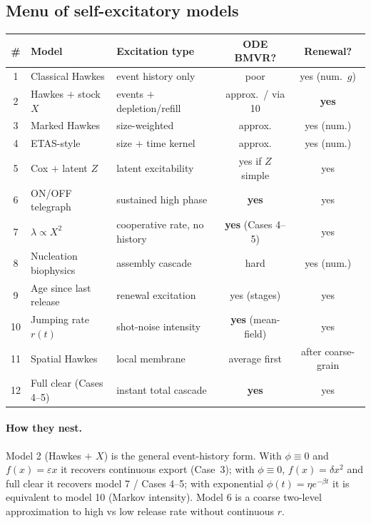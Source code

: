 \documentclass[11pt,a4paper]{article}
\theoremstyle{plain}
\theoremstyle{definition}
\theoremstyle{remark}
\begin{document}
\subsection{Menu of self-excitatory models}

\begin{center}
\renewcommand{\arraystretch}{1.2}
{\small
\begin{tabular}{@{}clp{}cc@{}}
\toprule
\# & Model & Excitation type & ODE BMVR? & Renewal? \\
\midrule
1 & Classical Hawkes & event history only & poor & yes (num.\ $g$) \\
2 & Hawkes $+$ stock $X$ & events $+$ depletion/refill & approx.\ / via 10 & \textbf{yes} \\
3 & Marked Hawkes & size-weighted & approx. & yes (num.) \\
4 & ETAS-style & size $+$ time kernel & approx. & yes (num.) \\
5 & Cox $+$ latent $Z$ & latent excitability & yes if $Z$ simple & yes \\
6 & ON/OFF telegraph & sustained high phase & \textbf{yes} & yes \\
7 & $\lambda\propto X^2$ & cooperative rate, no history & \textbf{yes} (Cases 4--5) & yes \\
8 & Nucleation biophysics & assembly cascade & hard & yes (num.) \\
9 & Age since last release & renewal excitation & yes (stages) & yes \\
10 & Jumping rate $r(t)$ & shot-noise intensity & \textbf{yes} (mean-field) & yes \\
11 & Spatial Hawkes & local membrane & average first & after coarse-grain \\
12 & Full clear (Cases 4--5) & instant total cascade & \textbf{yes} & yes \\
\bottomrule
\end{tabular}}
\end{center}

\paragraph{How they nest.}
Model 2 (Hawkes $+$ $X$) is the general event-history form. With
$\phi\equiv 0$ and $f(x)=\varepsilon x$ it recovers continuous export
(Case~3); with $\phi\equiv 0$, $f(x)=\delta x^2$ and full clear it recovers
model 7 / Cases 4--5; with exponential $\phi(t)=\eta e^{-\beta t}$ it is
equivalent to model 10 (Markov intensity). Model 6 is a coarse two-level
approximation to high vs low release rate without continuous $r$.
\end{document}
